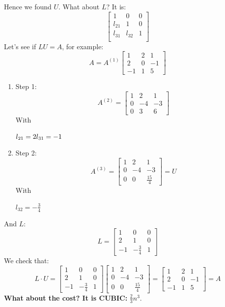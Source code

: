 Hence we found $U$. What about $L$? It is:
$$
\begin{bmatrix}
    1 & 0 & 0\\
    l_{21} & 1 & 0\\
    l_{31} & l_{32} & 1\\
\end{bmatrix}
$$
Let's see if $LU=A$, for example:
$$
A=A^{(1)}\begin{bmatrix}
    1 & 2 & 1\\
    2 & 0 & -1\\
    -1 & 1 & 5
\end{bmatrix}
$$
\begin{enumerate}
    \item Step 1:
    $$
    A^{(2)}=\begin{bmatrix}
        1 & 2 & 1\\
        0 & -4 & -3\\
        0 & 3 & 6
    \end{bmatrix}
    $$
    With

    $
    l_{21}=2\\
    l_{31}=-1\\
    $
    \item Step 2:
    $$
    A^{(3)}=\begin{bmatrix}
        1 & 2 & 1\\
        0 & -4 & -3\\
        0 & 0 & \frac{15}{4}
    \end{bmatrix}=U
    $$
    With

    $
    l_{32}=-\frac{3}{4}
    $
\end{enumerate}
And $L$:
$$
L=\begin{bmatrix}
    1 & 0 & 0\\
    2 & 1 & 0\\
    -1 & -\frac{3}{4} & 1
\end{bmatrix}
$$
We check that:
$$
L\cdot U=
\begin{bmatrix}
    1 & 0 & 0\\
    2 & 1 & 0\\
    -1 & -\frac{3}{4} & 1
\end{bmatrix}
\begin{bmatrix}
    1 & 2 & 1\\
    0 & -4 & -3\\
    0 & 0 & \frac{15}{4}
\end{bmatrix}=
\begin{bmatrix}
    1 & 2 & 1\\
    2 & 0 & -1\\
    -1 & 1 & 5
\end{bmatrix}=A
$$
\textbf{What about the cost? It is CUBIC: } $\frac{2}{3}n^3$.

